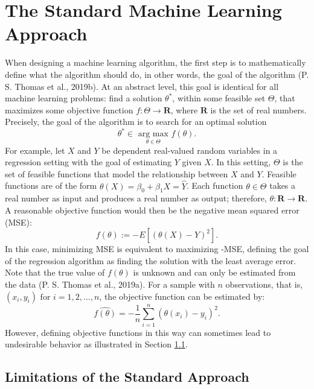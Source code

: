 \documentclass[12pt, twoside]{amherstthesis}
\begin{document}
\hypertarget{standardml}{%
\section{The Standard Machine Learning Approach}\label{standardml}}

When designing a machine learning algorithm, the first step is to mathematically define what the algorithm should do, in other words, the goal of the algorithm (P. S. Thomas et al., 2019b). At an abstract level, this goal is identical for all machine learning problems: find a solution \(\theta^*\), within some feasible set \(\Theta\), that maximizes some objective function \(f: \Theta \rightarrow \textbf{R}\), where \(\textbf{R}\) is the set of real numbers. Precisely, the goal of the algorithm is to search for an optimal solution
\begin{equation}
\label{ch2eq1}
\theta^* \in \underset{\theta \in \Theta}{\text{ arg max }} f(\theta).
\end{equation}
For example, let \(X\) and \(Y\) be dependent real-valued random variables in a regression setting with the goal of estimating \(Y\) given \(X\). In this setting, \(\Theta\) is the set of feasible functions that model the relationship between \(X\) and \(Y\). Feasible functions are of the form \(\theta(X) = \beta_0 + \beta_1X = \hat{Y}\). Each function \(\theta \in \Theta\) takes a real number as input and produces a real number as output; therefore, \(\theta : \textbf{R} \rightarrow \textbf{R}\). A reasonable objective function would then be the negative mean squared error (MSE):
\begin{equation}
\label{ch2eq2}
f(\theta):=-E[(\theta(X) - Y)^2].
\end{equation}
In this case, minimizing MSE is equivalent to maximizing -MSE, defining the goal of the regression algorithm as finding the solution with the least average error. Note that the true value of \(f(\theta)\) is unknown and can only be estimated from the data (P. S. Thomas et al., 2019a). For a sample with \(n\) observations, that is, \((x_i, y_i) \text{ for } i = 1,2,...,n\), the objective function can be estimated by:
\begin{equation}
\label{ch2eq3}
\hat{f(\theta)}= -\frac{1}{n} \sum_{i=1}^{n}(\theta(x_i) - y_i)^2.
\end{equation}
However, defining objective functions in this way can sometimes lead to undesirable behavior as illustrated in Section \ref{standardlimitations}.

\hypertarget{standardlimitations}{%
\subsection{Limitations of the Standard Approach}\label{standardlimitations}}
\end{document}

